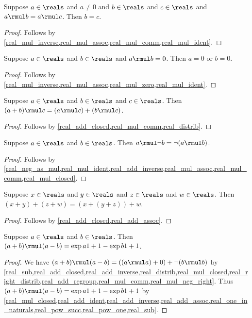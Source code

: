 \begin{proposition}\label{real_mul_cancel}
    Suppose $a\in\reals$ and $a\neq 0$ and $b\in\reals$ and $c\in\reals$ and $a \rmul b = a \rmul c$.
    Then $b = c$.
\end{proposition}
\begin{proof}
    Follows by \cref{real_mul_inverse,real_mul_assoc,real_mul_comm,real_mul_ident}.
\end{proof}

\begin{proposition}\label{real_mul_zero_product}
    Suppose $a\in\reals$ and $b\in\reals$ and $a \rmul b = 0$.
    Then $a = 0$ or $b = 0$.
\end{proposition}
\begin{proof}
    Follows by \cref{real_mul_inverse,real_mul_assoc,real_mul_zero,real_mul_ident}.
\end{proof}

\begin{lemma}\label{real_right_distrib}
    Suppose $a\in\reals$ and $b\in\reals$ and $c\in\reals$.
    Then $(a + b) \rmul c = (a \rmul c) + (b \rmul c)$.
\end{lemma}
\begin{proof}
    Follows by \cref{real_add_closed,real_mul_comm,real_distrib}.
\end{proof}

\begin{lemma}\label{real_mul_neg_right}
    Suppose $a\in\reals$ and $b\in\reals$.
    Then $a \rmul \neg{b} = \neg{(a \rmul b)}$.
\end{lemma}
\begin{proof}
    Follows by \cref{real_neg_as_mul,real_mul_ident,real_add_inverse,real_mul_assoc,real_mul_comm,real_mul_closed}.
\end{proof}

\begin{lemma}\label{real_add_regroup}
    Suppose $x\in\reals$ and $y\in\reals$ and $z\in\reals$ and $w\in\reals$.
    Then $(x + y) + (z + w) = (x + (y + z)) + w$.
\end{lemma}
\begin{proof}
    Follows by \cref{real_add_closed,real_add_assoc}.
\end{proof}

\begin{proposition}\label{real_diff_squares}
    Suppose $a\in\reals$ and $b\in\reals$.
    Then $(a + b) \rmul (a - b) = \exp{a}{1+1} - \exp{b}{1+1}$.
\end{proposition}
\begin{proof}
    We have $(a + b) \rmul (a - b) = ((a \rmul a) + 0) + \neg{(b \rmul b)}$
        by \cref{real_sub,real_add_closed,real_add_inverse,real_distrib,real_mul_closed,real_right_distrib,real_add_regroup,real_mul_comm,real_mul_neg_right}.
    Thus $(a + b) \rmul (a - b) = \exp{a}{1+1} - \exp{b}{1+1}$ by \cref{real_mul_closed,real_add_ident,real_add_inverse,real_add_assoc,real_one_in_naturals,real_pow_succ,real_pow_one,real_sub}.
\end{proof}


